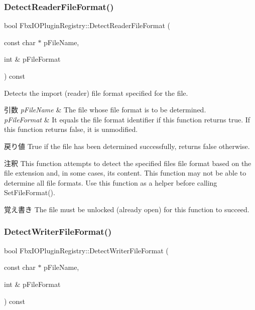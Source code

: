 \subsubsection{\texorpdfstring{Detect\+Reader\+File\+Format()}{DetectReaderFileFormat()}}
{\footnotesize\ttfamily bool Fbx\+I\+O\+Plugin\+Registry\+::\+Detect\+Reader\+File\+Format (\begin{DoxyParamCaption}\item[{const char $\ast$}]{p\+File\+Name,  }\item[{int \&}]{p\+File\+Format }\end{DoxyParamCaption}) const}

Detects the import (reader) file format specified for the file. 
\begin{DoxyParams}{引数}
{\em p\+File\+Name} & The file whose file format is to be determined. \\
\hline
{\em p\+File\+Format} & It equals the file format identifier if this function returns {\ttfamily true}. If this function returns {\ttfamily false}, it is unmodified. \\
\hline
\end{DoxyParams}
\begin{DoxyReturn}{戻り値}
{\ttfamily True} if the file has been determined successfully, returns {\ttfamily false} otherwise. 
\end{DoxyReturn}
\begin{DoxyRemark}{注釈}
This function attempts to detect the specified file\textquotesingle{}s file format based on the file extension and, in some cases, its content. This function may not be able to determine all file formats. Use this function as a helper before calling {\ttfamily Set\+File\+Format()}. 
\end{DoxyRemark}
\begin{DoxyNote}{覚え書き}
The file must be unlocked (already open) for this function to succeed. 
\end{DoxyNote}
\mbox{\label{class_fbx_i_o_plugin_registry_adcb5757258905fc61f574b877aa55b54}} 
\subsubsection{\texorpdfstring{Detect\+Writer\+File\+Format()}{DetectWriterFileFormat()}}
{\footnotesize\ttfamily bool Fbx\+I\+O\+Plugin\+Registry\+::\+Detect\+Writer\+File\+Format (\begin{DoxyParamCaption}\item[{const char $\ast$}]{p\+File\+Name,  }\item[{int \&}]{p\+File\+Format }\end{DoxyParamCaption}) const}

